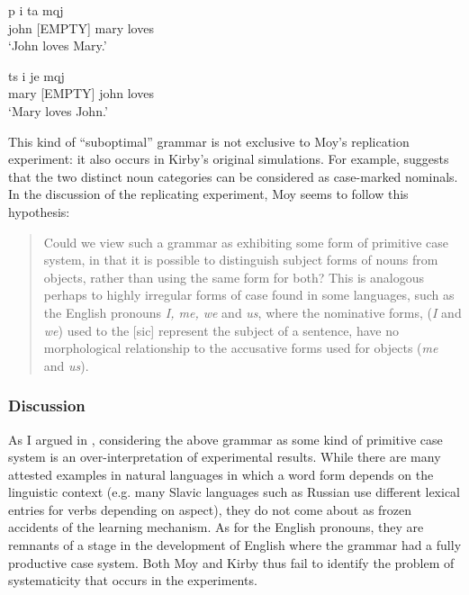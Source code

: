 \ea
\gll p i ta mqj \\
john {[EMPTY]} mary loves \\
\glt `John loves Mary.' \\

\item
\gll ts i je mqj \\
mary {[EMPTY]} john loves \\
\glt `Mary loves John.' \\
\z

This kind of ``suboptimal'' grammar is not exclusive to Moy's replication experiment: it also occurs in Kirby's original simulations. For example, \citet{kirby99syntax} suggests that the two distinct noun categories can be considered as case-marked nominals. In the discussion of the replicating experiment, Moy seems to follow this hypothesis:

\begin{quote}
Could we view such a grammar as exhibiting some form of primitive case system, in that it is possible to distinguish subject forms of nouns from objects, rather than using the same form for both? This is analogous perhaps to highly irregular forms of case found in some languages, such as the English pronouns {\em I, me, we} and {\em us}, where the nominative forms, ({\em I} and {\em we}) used to the [sic] represent the subject of a sentence, have no morphological relationship to the accusative forms used for objects ({\em me} and {\em us}). \citep[p. 114]{moy06case}
\end{quote}
 
\subsubsection{Discussion}
As I argued in , considering the above grammar as some kind of primitive case system is an over-interpretation of experimental results. While there are many attested examples in natural languages in which a word form depends on the linguistic context (e.g. many Slavic languages such as Russian use different lexical entries for verbs depending on aspect), they do not come about as frozen accidents of the learning mechanism. As for the English pronouns, they are remnants of a stage in the development of English where the grammar had a fully productive case system. Both Moy and Kirby thus fail to identify the problem of systematicity that occurs in the experiments.

